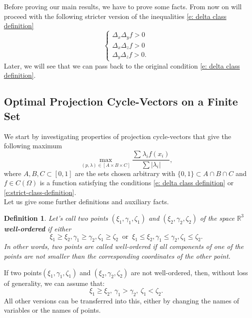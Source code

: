 \documentclass[12p]{article}
\numberwithin{equation}{section}
\newtheorem{definition}{Definition}[section]
\begin{document}
Before proving our main results, we have to prove some facts. From now on will proceed with the following stricter version of the inequalities \eqref{e: delta class definition}
\begin{equation} \label{e:strict-class-definition}
    \begin{cases}
        \Delta_x\Delta_y f> 0\\
        \Delta_x\Delta_z f> 0\\
        \Delta_y\Delta_z f> 0.
    \end{cases}
\end{equation} 
Later, we will see that we can pass back to the original condition \eqref{e: delta class definition}.

\subsection{Optimal Projection Cycle-Vectors  on a Finite Set} 

We start by investigating properties of projection cycle-vectors that give the following maximum
\begin{equation}\label{e: maximum-over-a-finite-set}
    \max_{(p,\lambda)\in [A\times B\times C]} \frac{\sum_{}\lambda_if(x_i)}{\sum|\lambda_i|},
\end{equation}
where \( A,B,C \subset [0,1]\) are the sets chosen arbitrary with \(\{0,1\}\subset A \cap B \cap C\) and \(f \in C(\Omega)\) is a function satisfying the conditions \eqref{e: delta class definition} or \eqref{e:strict-class-definition}.
\\
Let us give some further definitions and auxiliary facts.
\begin{definition}
    Let's call two points \((\xi_1,\gamma_1,\zeta_1)\) and \((\xi_2,\gamma_2,\zeta_2)\) of the space \(\mathbb{R}^3\) \textbf{well-ordered} if either \[\xi_1\ge \xi_2,\gamma_1 \ge \gamma_2 ,\zeta_1 \ge \zeta_2  \
    \text{ or } \
    \xi_1\le \xi_2,\gamma_1 \le \gamma_2 ,\zeta_1 \le \zeta_2.\]
    In other words, two points are called well-ordered if all components of one of the points are not smaller than the corresponding coordinates of the other point.
\end{definition}
If two points\((\xi_1,\gamma_1,\zeta_1)\) and \((\xi_2,\gamma_2,\zeta_2)\) are not well-ordered, then, without loss of generality, we can assume that:
    \[\xi_1\ge \xi_2, \ \gamma_1 > \gamma_2, \ \zeta_1 <\zeta_2.\]
All other versions can be transferred into this, either by changing the names of variables or the names of points.
\end{document}
